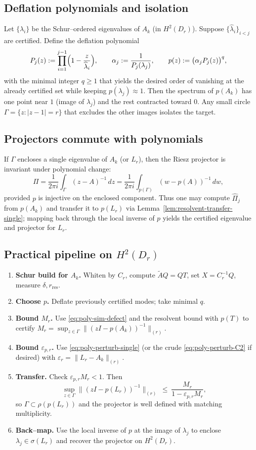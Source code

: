 \documentclass[11pt]{article}
\begin{document}
\subsection{Deflation polynomials and isolation}
Let \(\{\lambda_i\}\) be the Schur–ordered eigenvalues of \(A_k\) (in \(H^2(D_r)\)).
Suppose \(\{\widehat\lambda_i\}_{i<j}\) are certified. Define the deflation polynomial
\[
P_j(z):=\prod_{i=1}^{j-1}\Bigl(1-\frac{z}{\widehat\lambda_i}\Bigr),\qquad
\alpha_j:=\frac{1}{P_j(\lambda_j)},\qquad
p(z):=\bigl(\alpha_j P_j(z)\bigr)^q,
\]
with the minimal integer \(q\ge1\) that yields the desired order of vanishing at the
already certified set while keeping \(p(\lambda_j)\approx1\).
Then the spectrum of \(p(A_k)\) has one point near \(1\) (image of \(\lambda_j\))
and the rest contracted toward \(0\). Any small circle \(\Gamma=\{z:|z-1|=r\}\) that
excludes the other images isolates the target.

\subsection{Projectors commute with polynomials}
If \(\Gamma\) encloses a single eigenvalue of \(A_k\) (or \(L_r\)), then the Riesz
projector is invariant under polynomial change:
\[
\Pi=\frac{1}{2\pi i}\int_\Gamma (z-A)^{-1}\,dz
=\frac{1}{2\pi i}\int_{p(\Gamma)} (w-p(A))^{-1}\,dw,
\]
provided \(p\) is injective on the enclosed component. Thus one may compute
\(\widehat\Pi_j\) from \(p(A_k)\) and transfer it to \(p(L_r)\) via
Lemma~\ref{lem:resolvent-transfer-single}; mapping back through the local inverse of
\(p\) yields the certified eigenvalue and projector for \(L_r\).

\subsection{Practical pipeline on \texorpdfstring{$H^2(D_r)$}{H2(Dr)}}
\begin{enumerate}
\item \textbf{Schur build for \(A_k\).} Whiten by \(C_r\), compute \(\widetilde A Q=QT\),
set \(X=C_r^{-1}Q\), measure \(\delta, r_{\mathrm{res}}\).
\item \textbf{Choose \(p\).} Deflate previously certified modes; take minimal \(q\).
\item \textbf{Bound \(M_r\).} Use \eqref{eq:poly-sim-defect} and the resolvent bound with \(p(T)\)
to certify \(M_r=\sup_{z\in\Gamma}\|(zI-p(A_k))^{-1}\|_{(r)}\).
\item \textbf{Bound \(\varepsilon_{p,r}\).} Use \eqref{eq:poly-perturb-single} (or the crude
\eqref{eq:poly-perturb-C2} if desired) with \(\varepsilon_r=\|L_r-A_k\|_{(r)}\).
\item \textbf{Transfer.} Check \(\varepsilon_{p,r} M_r<1\). Then
\[
\sup_{z\in\Gamma}\|(zI-p(L_r))^{-1}\|_{(r)}\ \le\ \frac{M_r}{1-\varepsilon_{p,r}M_r},
\]
so \(\Gamma\subset\rho(p(L_r))\) and the projector is well defined with matching multiplicity.
\item \textbf{Back–map.} Use the local inverse of \(p\) at the image of \(\lambda_j\) to enclose
\(\lambda_j\in\sigma(L_r)\) and recover the projector on \(H^2(D_r)\).
\end{enumerate}
\end{document}
